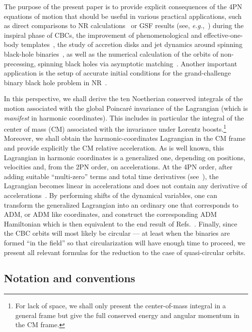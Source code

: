 \documentclass[prd,preprint,superscriptaddress,tightenlines,nofootinbib,
  eqsecnum,showpacs]{revtex4}
\begin{document}
The purpose of the present paper is to provide explicit consequences of the
4PN equations of motion that should be useful in various practical
applications, such as direct comparisons to NR calculations~\cite{Boyle08} or
GSF results (see, \textit{e.g.},~\cite{Det08}) during the inspiral phase of
CBCs, the improvement of phenomenological and effective-one-body
templates~\cite{Ajith11, DNorleans}, the study of accretion disks and jet
dynamics around spinning black-hole binaries~\cite{Campa12}, as well as the numerical
calculation of the orbits of non-precessing, spinning black holes via
asymptotic matching~\cite{Campa16}. Another important application is the
setup of accurate initial conditions for the grand-challenge binary black
hole problem in NR~\cite{Pret05, Camp06, Bak06}.

In this perspective, we shall derive the ten Noetherian conserved integrals of
the motion associated with the global Poincar\'e invariance of the Lagrangian
(which is \textit{manifest} in harmonic coordinates). This includes in
particular the integral of the center of mass (CM) associated with the
invariance under Lorentz boosts.\footnote{For lack of space, we shall only
  present the center-of-mass integral in a general frame but give the full
  conserved energy and angular momentum in the CM frame.} Moreover, we shall
obtain the harmonic-coordinates Lagrangian in the CM frame and provide
explicitly the CM relative acceleration. As is well known, this Lagrangian in
harmonic coordinates is a generalized one, depending on positions, velocities
and, from the 2PN order, on accelerations. At the 4PN order, after
adding suitable ``multi-zero'' terms and total time derivatives
(see~\cite{DS85}), the Lagrangian becomes linear in accelerations and does not
contain any derivative of accelerations~\cite{BBBFMa}. By performing shifts of
the dynamical variables, one can transform the generalized Lagrangian into an
ordinary one that corresponds to ADM, or ADM like coordinates, and construct
the corresponding ADM Hamiltonian which is then equivalent to the end result
of Refs.~\cite{DJS14, DJS16}. Finally, since the CBC orbits will
most likely be circular --- at least when the binaries are formed ``in the
field'' so that circularization will have enough time to proceed, we
present all relevant formulas for the reduction to the case of quasi-circular
orbits.

\subsection{Notation and conventions}
\label{sec:not}
\end{document}
